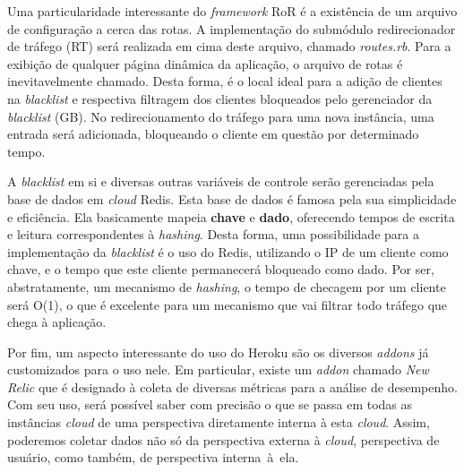 Uma particularidade interessante do \emph{framework} RoR é a existência de um arquivo de configuração a cerca das rotas. A implementação do submódulo redirecionador de tráfego (RT) será realizada em cima deste arquivo, chamado \emph{routes.rb}. Para a exibição de qualquer página dinâmica da aplicação, o arquivo de rotas é inevitavelmente chamado. Desta forma, é o local ideal para a adição de clientes na \emph{blacklist} e respectiva filtragem dos clientes bloqueados pelo gerenciador da \emph{blacklist} (GB). No redirecionamento do tráfego para uma nova instância, uma entrada será adicionada, bloqueando o cliente em questão por determinado tempo.

A \emph{blacklist} em si e diversas outras variáveis de controle serão gerenciadas pela base de dados em \emph{cloud} Redis. Esta base de dados é famosa pela sua simplicidade e eficiência. Ela basicamente mapeia \textbf{chave} e \textbf{dado}, oferecendo tempos de escrita e leitura correspondentes à \emph{hashing}. Desta forma, uma possibilidade para a implementação da \emph{blacklist} é o uso do Redis, utilizando o IP de um cliente como chave, e o tempo que este cliente permanecerá bloqueado como dado. Por ser, abstratamente, um mecanismo de \emph{hashing}, o tempo de checagem por um cliente será O(1), o que é excelente para um mecanismo que vai filtrar todo tráfego que chega à aplicação.

Por fim, um aspecto interessante do uso do Heroku são os diversos \emph{addons} já customizados para o uso nele. Em particular, existe um \emph{addon} chamado \emph{New Relic} que é designado à coleta de diversas métricas para a análise de desempenho. Com seu uso, será possível saber com precisão o que se passa em todas as instâncias \emph{cloud} de uma perspectiva diretamente interna à esta \emph{cloud}. Assim, poderemos coletar dados não só da perspectiva externa à \emph{cloud}, perspectiva de usuário, como também, de perspectiva interna~à~ela.